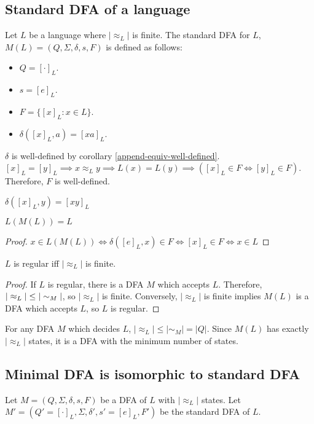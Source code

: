 \subsection{Standard DFA of a language}

Let $L$ be a language where $|\approx_L|$ is finite.
The standard DFA for $L$, $M(L) = (Q, \Sigma, \delta, s, F)$ is defined as follows:
\begin{itemize}
\item $Q = [\cdot]_L$.
\item $s = [e]_L$.
\item $F = \{[x]_L: x \in L\}$.
\item $\delta([x]_L, a) = [xa]_L$.
\end{itemize}

$\delta$ is well-defined by corollary \ref{append-equiv-well-defined}.
$[x]_L = [y]_L \implies x \approx_L y \implies L(x) = L(y) \implies ([x]_L \in F \iff [y]_L \in F)$.
Therefore, $F$ is well-defined.

\begin{lemma}
$\delta([x]_L, y) = [xy]_L$\end{lemma}
\begin{theorem} $L(M(L)) = L$ \end{theorem}
\begin{proof} $x \in L(M(L)) \iff \delta([e]_L, x) \in F \iff [x]_L \in F \iff x \in L$ \end{proof}
\begin{theorem} $L$ is regular iff $|\approx_L|$ is finite. \end{theorem}
\begin{proof} If $L$ is regular, there is a DFA $M$ which accepts $L$.
Therefore, $|\nobreak\approx_L\nobreak| \le |\nobreak\sim_M\nobreak|$, so $|\approx_L|$ is finite.
Conversely, $|\approx_L|$ is finite implies $M(L)$ is a DFA which accepts $L$,
so $L$ is regular. \end{proof}

For any DFA $M$ which decides $L$, $|\approx_L| \le |\sim_M| = |Q|$.
Since $M(L)$ has exactly $|\approx_L|$ states, it is a DFA with the minimum number of states.

\subsection{Minimal DFA is isomorphic to standard DFA}

Let $M = (Q, \Sigma, \delta, s, F)$ be a DFA of $L$ with $|\approx_L|$ states.
Let $M' = (Q'=[\cdot]_L, \Sigma, \delta', s'=[e]_L, F')$ be the standard DFA of $L$.

